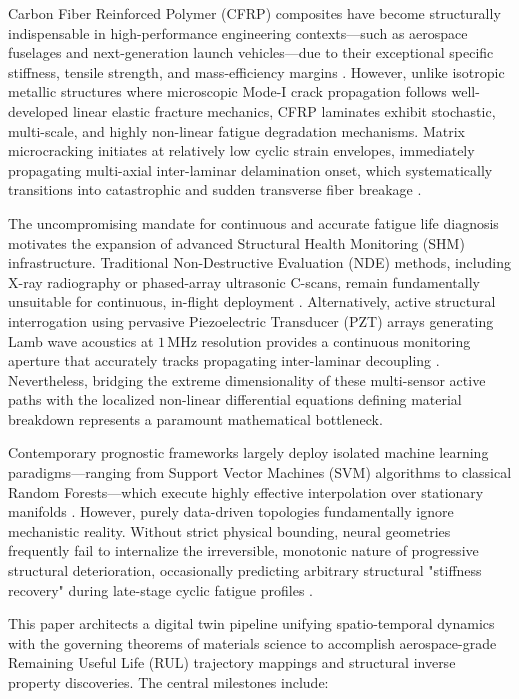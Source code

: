 \documentclass[conference]{IEEEtran}
\begin{document}
Carbon Fiber Reinforced Polymer (CFRP) composites have become structurally indispensable in high-performance engineering contexts—such as aerospace fuselages and next-generation launch vehicles—due to their exceptional specific stiffness, tensile strength, and mass-efficiency margins \cite{mouritz2012review, gao2024digital}. However, unlike isotropic metallic structures where microscopic Mode-I crack propagation follows well-developed linear elastic fracture mechanics, CFRP laminates exhibit stochastic, multi-scale, and highly non-linear fatigue degradation mechanisms. Matrix microcracking initiates at relatively low cyclic strain envelopes, immediately propagating multi-axial inter-laminar delamination onset, which systematically transitions into catastrophic and sudden transverse fiber breakage \cite{reifsnider1991damage, su2009identification}.

The uncompromising mandate for continuous and accurate fatigue life diagnosis motivates the expansion of advanced Structural Health Monitoring (SHM) infrastructure. Traditional Non-Destructive Evaluation (NDE) methods, including X-ray radiography or phased-array ultrasonic C-scans, remain fundamentally unsuitable for continuous, in-flight deployment \cite{khan2019damage}. Alternatively, active structural interrogation using pervasive Piezoelectric Transducer (PZT) arrays generating Lamb wave acoustics at $1\,\text{MHz}$ resolution provides a continuous monitoring aperture that accurately tracks propagating inter-laminar decoupling \cite{loutas2017data}. Nevertheless, bridging the extreme dimensionality of these multi-sensor active paths with the localized non-linear differential equations defining material breakdown represents a paramount mathematical bottleneck.

Contemporary prognostic frameworks largely deploy isolated machine learning paradigms—ranging from Support Vector Machines (SVM) algorithms to classical Random Forests—which execute highly effective interpolation over stationary manifolds \cite{ray2018machine}. However, purely data-driven topologies fundamentally ignore mechanistic reality. Without strict physical bounding, neural geometries frequently fail to internalize the irreversible, monotonic nature of progressive structural deterioration, occasionally predicting arbitrary structural "stiffness recovery" during late-stage cyclic fatigue profiles \cite{raissi2019physics, wang2024physics}.

This paper architects a digital twin pipeline unifying spatio-temporal dynamics with the governing theorems of materials science to accomplish aerospace-grade Remaining Useful Life (RUL) trajectory mappings and structural inverse property discoveries. The central milestones include:
\end{document}
